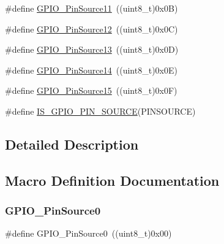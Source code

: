 \begin{DoxyCompactItemize}
\item 
\#define \mbox{\hyperlink{group___g_p_i_o___pin__sources_ga446be4a99e84eefb5c71a643211f598b}{G\+P\+I\+O\+\_\+\+Pin\+Source11}}~((uint8\+\_\+t)0x0\+B)
\item 
\#define \mbox{\hyperlink{group___g_p_i_o___pin__sources_gaaa64892c00d50b0fa49f0ce72a83e6e0}{G\+P\+I\+O\+\_\+\+Pin\+Source12}}~((uint8\+\_\+t)0x0\+C)
\item 
\#define \mbox{\hyperlink{group___g_p_i_o___pin__sources_gace4beb385facd306324fa9e362df5fda}{G\+P\+I\+O\+\_\+\+Pin\+Source13}}~((uint8\+\_\+t)0x0\+D)
\item 
\#define \mbox{\hyperlink{group___g_p_i_o___pin__sources_ga5fbb540a86af4015a46ac16c61ddb1f7}{G\+P\+I\+O\+\_\+\+Pin\+Source14}}~((uint8\+\_\+t)0x0\+E)
\item 
\#define \mbox{\hyperlink{group___g_p_i_o___pin__sources_ga9b29d9a9ecb1579ecedf4ea53ccbfd5b}{G\+P\+I\+O\+\_\+\+Pin\+Source15}}~((uint8\+\_\+t)0x0\+F)
\item 
\#define \mbox{\hyperlink{group___g_p_i_o___pin__sources_ga689e4e72591136b6a8d4df9d895181f7}{I\+S\+\_\+\+G\+P\+I\+O\+\_\+\+P\+I\+N\+\_\+\+S\+O\+U\+R\+CE}}(P\+I\+N\+S\+O\+U\+R\+CE)
\end{DoxyCompactItemize}


\subsection{Detailed Description}


\subsection{Macro Definition Documentation}
\mbox{\label{group___g_p_i_o___pin__sources_ga028bcbdf5a7fd81ec45830f60a022bb4}} 
\subsubsection{\texorpdfstring{GPIO\_PinSource0}{GPIO\_PinSource0}}
{\footnotesize\ttfamily \#define G\+P\+I\+O\+\_\+\+Pin\+Source0~((uint8\+\_\+t)0x00)}

\mbox{\label{group___g_p_i_o___pin__sources_gad02324cdd8526a7aacd15a5a910d56f1}} 
